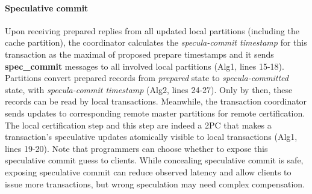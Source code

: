 \paragraph{Speculative commit} Upon receiving prepared replies from all updated local partitions (including the cache partition), the coordinator calculates the \textit{specula-commit timestamp} for this transaction as the maximal of proposed prepare timestamps and it sends \textbf{spec\_commit} messages to all involved local partitions (Alg1, lines 15-18). Partitions convert prepared records from \textit{prepared} state to \textit{specula-committed} state, with \textit{specula-commit timestamp} (Alg2, lines 24-27). Only by then, these records can be read by local transactions. Meanwhile, the transaction coordinator sends updates to corresponding remote master partitions for remote certification. The local certification step and this step are indeed a 2PC that makes a transaction's speculative updates atomically visible to local transactions (Alg1, lines 19-20). Note that programmers can choose whether to expose this speculative commit guess to clients. While concealing speculative commit is safe, exposing speculative commit can reduce observed latency and allow clients to issue more transactions, but wrong speculation may need complex compensation.

